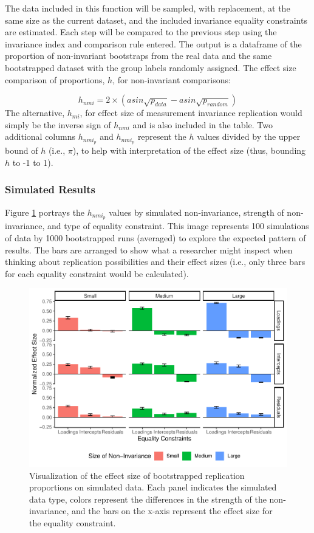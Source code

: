 \documentclass[
  man]{apa7}
\begin{document}
\normalsize

The data included in this function will be sampled, with replacement, at the same size as the current dataset, and the included invariance equality constraints are estimated. Each step will be compared to the previous step using the invariance index and comparison rule entered. The output is a dataframe of the proportion of non-invariant bootstraps from the real data and the same bootstrapped dataset with the group labels randomly assigned. The effect size comparison of proportions, \(h\), for non-invariant comparisons:

\[h_{nmi} = 2 \times (asin\sqrt{p_{data}} - asin\sqrt{p_{random}})\]
The alternative, \(h_{mi}\), for effect size of measurement invariance replication would simply be the inverse sign of \(h_{nmi}\) and is also included in the table. Two additional columns \(h_{nmi_p}\) and \(h_{nmi_p}\) represent the \(h\) values divided by the upper bound of \(h\) (i.e., \(\pi\)), to help with interpretation of the effect size (thus, bounding \(h\) to -1 to 1).

\hypertarget{simulated-results-1}{%
\subsubsection{Simulated Results}\label{simulated-results-1}}

Figure \ref{fig:boot-rr-pic} portrays the \(h_{nmi_p}\) values by simulated non-invariance, strength of non-invariance, and type of equality constraint. This image represents 100 simulations of data by 1000 bootstrapped runs (averaged) to explore the expected pattern of results. The bars are arranged to show what a researcher might inspect when thinking about replication possibilities and their effect sizes (i.e., only three bars for each equality constraint would be calculated).

\begin{figure}
\centering
\includegraphics{manuscript_files/figure-latex/boot-rr-pic-1.pdf}
\caption{\label{fig:boot-rr-pic}Visualization of the effect size of bootstrapped replication proportions on simulated data. Each panel indicates the simulated data type, colors represent the differences in the strength of the non-invariance, and the bars on the x-axis represent the effect size for the equality constraint.}
\end{figure}
\end{document}
